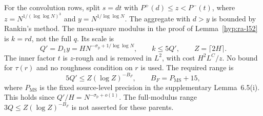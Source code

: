 For the convolution rows, split \(s=dt\) with
\(P^+(d)\le z< P^-(t)\), where
\(z=N^{1/(\log\log N)^3}\) and \(y=N^{1/\log\log N}\). The aggregate
with \(d>y\) is bounded by Rankin's method. The mean-square modulus in the
proof of Lemma~\ref{hyp:ra-l52} is \(k=rd\), not the full \(q\).
Its scale is
\begin{equation}\label{eq:ra-l52-small-modulus}
 Q'=D_1y=HN^{-\sigma_{\mathrm p}+1/\log\log N},\qquad
 k\le5Q',\qquad Z=\lceil2H\rceil.
\end{equation}
The inner factor \(t\) is \(z\)-rough and is removed in \(L^2\), with cost
\(H^2L^C/z\). No bound for \(\tau(r)\) and no roughness condition on \(r\)
is used. The required range is
\begin{equation}\label{eq:ra-l52-range}
 5Q'\le Z(\log Z)^{-B_F},\qquad B_F=P_{\mathrm{MS}}+15,
\end{equation}
where \(P_{\mathrm{MS}}\) is the fixed source-level precision in the
supplementary Lemma~6.5(i). This holds since
\(Q'/H=N^{-\sigma_{\mathrm p}+o(1)}\). The full-modulus
range \(3Q\le Z(\log Z)^{-B_F}\) is not asserted for these parents.

